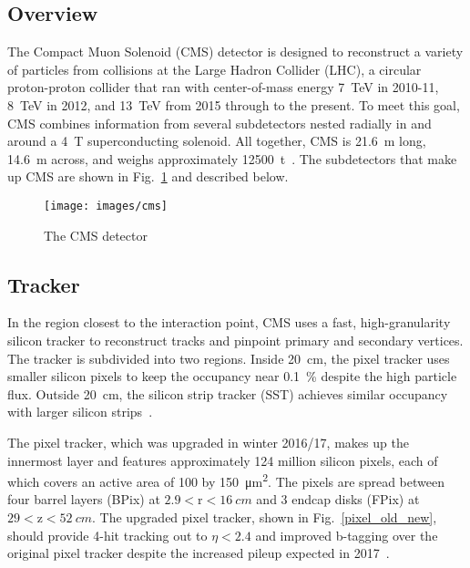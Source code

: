 \documentclass[12pt]{article}
\begin{document}
    \subsection{Overview}
        The Compact Muon Solenoid (CMS) detector is designed to reconstruct a variety of particles from collisions at the Large Hadron Collider (LHC), a circular proton-proton collider that ran with center-of-mass energy \SI{7}{\tera\electronvolt} in 2010-11, \SI{8}{\tera\electronvolt} in 2012, and \SI{13}{\tera\electronvolt} from 2015 through to the present. To meet this goal, CMS combines information from several subdetectors nested radially in and around a \SI{4}{\tesla} superconducting solenoid. All together, CMS is \SI{21.6}{\m} long, \SI{14.6}{\m} across, and weighs approximately \SI{12500}{t}~\cite{cms_experiment}. The subdetectors that make up CMS are shown in Fig.~\ref{cms} and described below.

        \noindent \begin{figure}[htbp] \begin{center}
        \texttt{[image: images/cms]}
        \caption{The CMS detector~\cite{cms_image}}
        \label{cms}
        \end{center} \end{figure}

    \subsection{Tracker}
        In the region closest to the interaction point, CMS uses a fast, high-granularity silicon tracker to reconstruct tracks and pinpoint primary and secondary vertices. The tracker is subdivided into two regions. Inside \SI{20}{cm}, the pixel tracker  uses smaller silicon pixels to keep the occupancy near \SI{0.1}{\percent} despite the high particle flux. Outside \SI{20}{\cm}, the silicon strip tracker (SST) achieves similar occupancy with larger silicon strips~\cite{cms_tdr}.  

        The pixel tracker, which was upgraded in winter 2016/17, makes up the innermost layer and features approximately \num{124} million silicon pixels, each of which covers an active area of \num{100} by \SI{150}{\micro\meter^2}. The pixels are spread between four barrel layers (BPix) at $\num{2.9}<\mathrm{r}<\SI{16}{cm}$ and 3 endcap disks (FPix) at $\num{29} < \mathrm{z} < \SI{52}{cm}$. The upgraded pixel tracker, shown in Fig.~\ref{pixel_old_new}, should provide 4-hit tracking out to $\eta < \num{2.4}$ and improved b-tagging over the original pixel tracker despite the increased pileup expected in 2017~\cite{cms_pixel_upgrade}.
\end{document}
